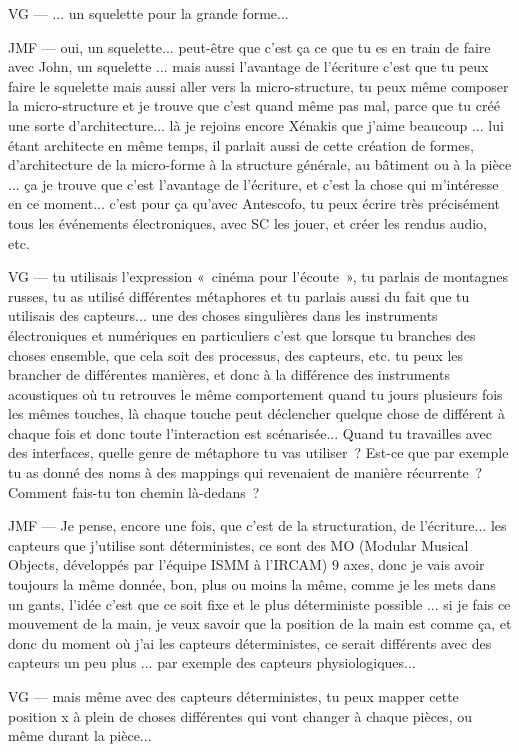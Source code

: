 VG — ... un squelette pour la grande forme... 

JMF — oui, un squelette... peut-être que c'est ça ce que tu es en train de faire avec John, un squelette ... mais aussi l'avantage de l'écriture c'est que tu peux faire le squelette mais aussi aller vers la micro-structure, tu peux même composer la micro-structure et je trouve que c'est quand même pas mal, parce que tu créé une sorte d'architecture... là je rejoins encore Xénakis que j'aime beaucoup ... lui étant architecte en même temps, il parlait aussi de cette création de formes, d'architecture de la micro-forme à la structure générale, au bâtiment ou à la pièce ... ça je trouve que c'est l'avantage de l'écriture, et c'est la chose qui m'intéresse en ce moment... c'est pour ça qu'avec Antescofo, tu peux écrire très précisément tous les événements électroniques, avec SC les jouer, et créer les rendus audio, etc.  

VG — tu utilisais l'expression « cinéma pour l'écoute », tu parlais de montagnes russes, tu as utilisé différentes métaphores et tu parlais aussi du fait que tu utilisais des capteurs... une des choses singulières dans les instruments électroniques et numériques en particuliers c'est que lorsque tu branches des choses ensemble, que cela soit des processus, des capteurs, etc. tu peux les brancher de différentes manières, et donc à la différence des instruments acoustiques où tu retrouves le même comportement quand tu jours plusieurs fois les mêmes touches, là chaque touche peut déclencher quelque chose de différent à chaque fois et donc toute l'interaction est scénarisée... Quand tu travailles avec des interfaces, quelle genre de métaphore tu vas utiliser ? Est-ce que par exemple tu as donné des noms à des mappings qui revenaient de manière récurrente ? Comment fais-tu ton chemin là-dedans ? 

JMF — Je pense, encore une fois, que c'est de la structuration, de l'écriture... les capteurs que j'utilise sont déterministes, ce sont des MO (Modular Musical Objects, développés par l'équipe ISMM à l'IRCAM) 9 axes, donc je vais avoir toujours la même donnée, bon, plus ou moins la même, comme je les mets dans un gants, l'idée c'est que ce soit fixe et le plus déterministe possible ... si je fais ce mouvement de la main, je veux savoir que la position de la main est comme ça, et donc du moment où j'ai les capteurs déterministes, ce serait différents avec des capteurs un peu plus ... par exemple des capteurs physiologiques... 

VG — mais même avec des capteurs déterministes, tu peux mapper cette position x à plein de choses différentes qui vont changer à chaque pièces, ou même durant la pièce... 

